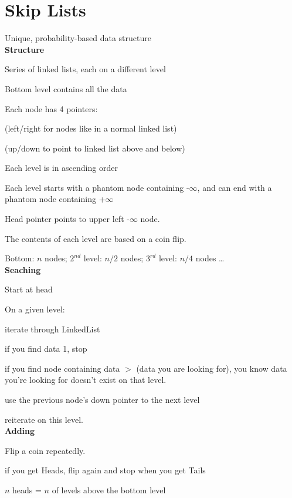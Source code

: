 \documentclass{exam}
\begin{document}
    \section{Skip Lists}
    
    Unique, probability-based data structure\\
    
    \textbf{Structure}
    
    Series of linked lists, each on a different level
    
    Bottom level contains all the data
    
    Each node has 4 pointers:
    
     (left/right for nodes like in a normal linked list)
     
     (up/down to point to linked list above and below)
     
    Each level is in ascending order
    
    Each level starts with a phantom node containing -$\infty$, and can end with a phantom node containing +$\infty$
    
    Head pointer points to upper left -$\infty$ node.
    
    The contents of each level are based on a coin flip.
    
    Bottom: $n$ nodes; $2^{nd}$ level: $n/2$ nodes; $3^{rd}$ level: $n/4$ nodes \dots\\
    
    \textbf{Seaching}
    
    Start at head
    
    On a given level:
    
    \quad iterate through LinkedList
    
    \quad\quad if you find data 1, stop
    
    \quad\quad if you find node containing data $>$ (data you are looking for), you know data you're looking for doesn't exist on that level.
    
    \quad\quad use the previous node's down pointer to the next level
    
    \quad\quad reiterate on this level.\\
    
    \textbf{Adding}
    
    Flip a coin repeatedly.
    
    \quad if you get Heads, flip again and stop when you get Tails
    
    \quad $n$ heads = $n$ of levels above the bottom level
    
\end{document}
